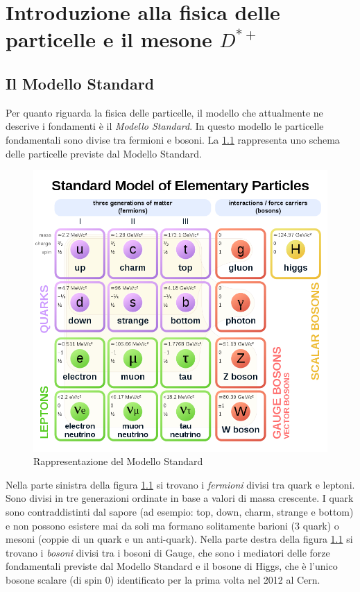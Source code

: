 \chapter{Introduzione alla fisica delle particelle e il mesone $D^{*+}$ }

\section{Il Modello Standard}
Per quanto riguarda la fisica delle particelle, il modello che attualmente ne descrive i fondamenti è il \textit{Modello Standard}. In questo modello le particelle fondamentali sono divise tra fermioni e bosoni. La \ref{fig:ModelloStandard} rappresenta uno schema delle particelle previste dal Modello Standard.

    \begin{figure}[htbp]
        \centering
        \includegraphics[width=0.65\linewidth]{introParticelle/ModelloStandard.png}
        \caption{Rappresentazione del Modello Standard}
        \label{fig:ModelloStandard}
    \end{figure}
    
Nella parte sinistra della figura \ref{fig:ModelloStandard} si trovano i \textit{fermioni} divisi tra quark e leptoni. Sono divisi in tre generazioni ordinate in base a valori di massa crescente. I quark sono contraddistinti dal sapore (ad esempio: top, down, charm, strange e bottom) e non possono esistere mai da soli ma formano solitamente barioni (3 quark) o mesoni (coppie di un quark e un anti-quark). Nella parte destra della figura \ref{fig:ModelloStandard} si trovano i \textit{bosoni} divisi tra i bosoni di Gauge, che sono i mediatori delle forze fondamentali previste dal Modello Standard e il bosone di Higgs, che è l'unico bosone scalare (di spin 0) identificato per la prima volta nel 2012 al Cern.

